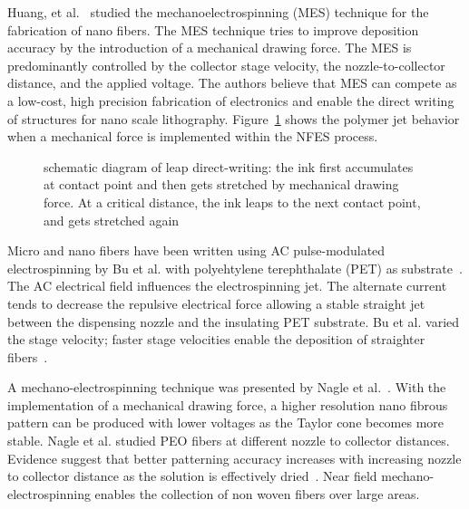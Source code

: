 Huang, et al.\unskip~\cite{527120:11974311} studied the mechanoelectrospinning (MES) technique for the fabrication of nano fibers. The MES technique tries to improve deposition accuracy by the introduction of a mechanical drawing force. The MES is predominantly controlled by the collector stage velocity, the nozzle-to-collector distance, and the applied voltage. The authors believe that MES can compete as a low-cost, high precision fabrication of electronics and enable the direct writing of structures for nano scale lithography. Figure~\ref{f-7587d8081ccc} shows the polymer jet behavior when a mechanical force is implemented within the NFES process.


\bgroup
\begin{figure}[!htbp]
\centering \makeatletter{}
\makeatother 
\caption{{schematic diagram of leap direct-writing: the ink first accumulates at contact point and then gets stretched by mechanical drawing force. At a critical distance, the ink leaps to the next contact point, and gets stretched again \unskip~\protect\cite{527120:11974311}}}
\label{f-7587d8081ccc}
\end{figure}
\egroup
Micro and nano fibers have been written using AC pulse-modulated electrospinning by Bu et al. with polyehtylene terephthalate (PET) as substrate\unskip~\cite{527120:11974304}. The AC electrical field influences the electrospinning jet. The alternate current tends to decrease the repulsive electrical force allowing a stable straight jet between the dispensing nozzle and the insulating PET substrate. Bu et al. varied the stage velocity; faster stage velocities enable the deposition of straighter fibers\unskip~\cite{527120:11974304}.

 A mechano-electrospinning technique was presented by Nagle et al.\unskip~\cite{527120:12033656}. With the implementation of a mechanical drawing force, a higher resolution nano fibrous pattern can be produced with lower voltages as the Taylor cone becomes more stable. Nagle et al. studied PEO fibers at different nozzle to collector distances. Evidence suggest that better patterning accuracy increases with increasing nozzle to collector distance as the solution is effectively dried\unskip~\cite{527120:12033656}. Near field mechano-electrospinning enables the collection of non woven fibers over large areas.


